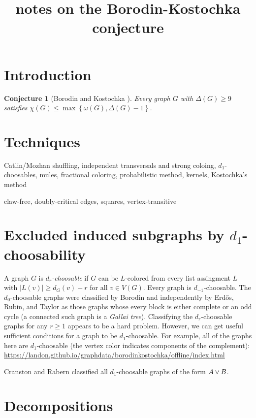 \documentclass[12pt]{article}
\title{notes on the Borodin-Kostochka conjecture}
\author{}
\theoremstyle{plain}
\newtheorem{conjecture}[thm]{Conjecture}
\theoremstyle{definition}
\theoremstyle{remark}
\newcommand{\set}[1]{\left\{ #1 \right\}}
\newcommand{\card}[1]{\left|#1\right|}
\newcommand{\join}[2]{#1 \mbox{\hspace{2 pt}$\vee$\hspace{2 pt}} #2}
\begin{document}
\maketitle

\section{Introduction}
\begin{conjecture}[Borodin and Kostochka \cite{borodin1977upper}]
Every graph $G$ with $\Delta(G) \ge 9$ satisfies $\chi(G) \le \max\set{\omega(G), \Delta(G) - 1}$.
\end{conjecture}

\section{Techniques}
Catlin/Mozhan shuffling, independent transversals and strong coloing, $d_1$-choosables, mules, fractional coloring, probabilistic method, kernels, Kostochka's method

claw-free, doubly-critical edges, squares, vertex-transitive

\section{Excluded induced subgraphs by $d_1$-choosability}\label{d1choosable}
A graph $G$ is \emph{$d_r$-choosable} if $G$ can be $L$-colored from every list assingment $L$ with $\card{L(v)} \ge d_G(v) - r$ for all $v \in V(G)$.
Every graph is $d_{-1}$-choosable.  
The $d_0$-choosable graphs were classified by Borodin \cite{borodin1977criterion} and independently by Erd\H{o}s, Rubin, and Taylor \cite{erdos1979choosability} as those
graphs whose every block is either complete or an odd cycle (a connected such graph is a \emph{Gallai tree}).  Classifying the $d_r$-choosable graphs for any $r \ge 1$ appears
to be a hard problem.  However, we can get useful sufficient conditions for a graph to be $d_1$-choosable.  For example, all of the graphs here are $d_1$-choosable (the vertex color indicates
components of the complement): \url{https://landon.github.io/graphdata/borodinkostochka/offline/index.html}

Cranston and Rabern \cite{mules} classified all $d_1$-choosable graphs of the form $\join{A}{B}$.

\section{Decompositions}
\end{document}
